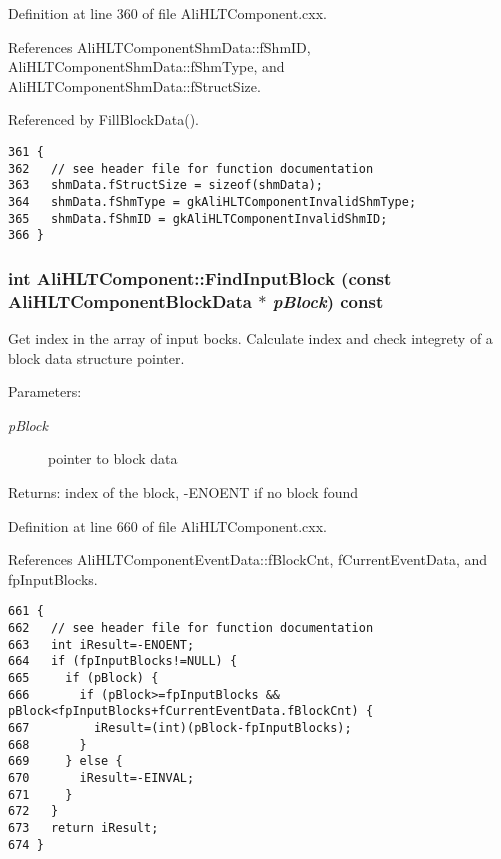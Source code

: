 Definition at line 360 of file Ali\-HLTComponent.cxx.

References Ali\-HLTComponent\-Shm\-Data::f\-Shm\-ID, Ali\-HLTComponent\-Shm\-Data::f\-Shm\-Type, and Ali\-HLTComponent\-Shm\-Data::f\-Struct\-Size.

Referenced by Fill\-Block\-Data().

\footnotesize\begin{verbatim}361 {
362   // see header file for function documentation
363   shmData.fStructSize = sizeof(shmData);
364   shmData.fShmType = gkAliHLTComponentInvalidShmType;
365   shmData.fShmID = gkAliHLTComponentInvalidShmID;
366 }
\end{verbatim}\normalsize 


\subsubsection{\setlength{\rightskip}{0pt plus 5cm}int Ali\-HLTComponent::Find\-Input\-Block (const {\bf Ali\-HLTComponent\-Block\-Data} $\ast$ {\em p\-Block}) const\hspace{0.3cm}{\tt  [private]}}\label{classAliHLTComponent_d2}


Get index in the array of input bocks. Calculate index and check integrety of a block data structure pointer. \begin{Desc}
\item[Parameters:]
\begin{description}
\item[{\em p\-Block}]pointer to block data \end{description}
\end{Desc}
\begin{Desc}
\item[Returns:]index of the block, -ENOENT if no block found \end{Desc}


Definition at line 660 of file Ali\-HLTComponent.cxx.

References Ali\-HLTComponent\-Event\-Data::f\-Block\-Cnt, f\-Current\-Event\-Data, and fp\-Input\-Blocks.

\footnotesize\begin{verbatim}661 {
662   // see header file for function documentation
663   int iResult=-ENOENT;
664   if (fpInputBlocks!=NULL) {
665     if (pBlock) {
666       if (pBlock>=fpInputBlocks && pBlock<fpInputBlocks+fCurrentEventData.fBlockCnt) {
667         iResult=(int)(pBlock-fpInputBlocks);
668       }
669     } else {
670       iResult=-EINVAL;
671     }
672   }
673   return iResult;
674 }
\end{verbatim}\normalsize 


